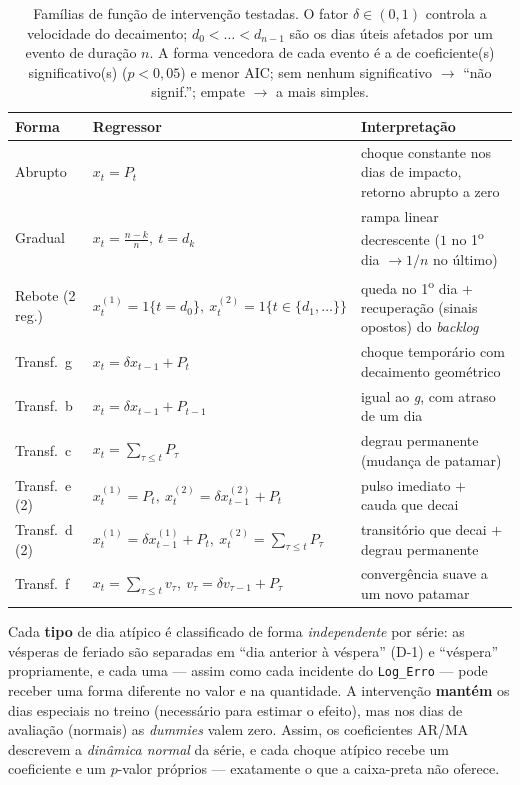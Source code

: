 \documentclass[11pt,a4paper]{article}
\begin{document}
\begin{table}[H]
\centering
\caption{Famílias de função de intervenção testadas. O fator $\delta \in (0,1)$ controla a
velocidade do decaimento; $d_0<\dots<d_{n-1}$ são os dias úteis afetados por um evento de duração
$n$. A forma vencedora de cada evento é a de coeficiente(s) significativo(s) ($p<0{,}05$) e menor
AIC; sem nenhum significativo $\to$ ``não signif.''; empate $\to$ a mais simples.}
\label{tab:transfer}
\small
\renewcommand{\arraystretch}{1.45}
\begin{tabular}{@{}llp{5.2cm}@{}}
\toprule
\textbf{Forma} & \textbf{Regressor} & \textbf{Interpretação} \\
\midrule
Abrupto        & $x_t = P_t$ & choque constante nos dias de impacto, retorno abrupto a zero \\
Gradual        & $x_t = \tfrac{n-k}{n},\ t=d_k$ & rampa linear decrescente ($1$ no 1\textsuperscript{o} dia $\to 1/n$ no último) \\
Rebote (2 reg.)& $x^{(1)}_t=1\{t=d_0\},\ x^{(2)}_t=1\{t\in\{d_1,\dots\}\}$ & queda no 1\textsuperscript{o} dia + recuperação (sinais opostos) do \emph{backlog} \\
Transf.\ g     & $x_t=\delta x_{t-1}+P_t$ & choque temporário com decaimento geométrico \\
Transf.\ b     & $x_t=\delta x_{t-1}+P_{t-1}$ & igual ao \emph{g}, com atraso de um dia \\
Transf.\ c     & $x_t=\sum_{\tau\le t}P_\tau$ & degrau permanente (mudança de patamar) \\
Transf.\ e (2) & $x^{(1)}_t=P_t,\ x^{(2)}_t=\delta x^{(2)}_{t-1}+P_t$ & pulso imediato $+$ cauda que decai \\
Transf.\ d (2) & $x^{(1)}_t=\delta x^{(1)}_{t-1}+P_t,\ x^{(2)}_t=\sum_{\tau\le t}P_\tau$ & transitório que decai $+$ degrau permanente \\
Transf.\ f     & $x_t=\sum_{\tau\le t}v_\tau,\ v_\tau=\delta v_{\tau-1}+P_\tau$ & convergência suave a um novo patamar \\
\bottomrule
\end{tabular}
\end{table}

\noindent
Cada \textbf{tipo} de dia atípico é classificado de forma \emph{independente} por série: as
vésperas de feriado são separadas em ``dia anterior à véspera'' (D-1) e ``véspera'' propriamente, e
cada uma --- assim como cada incidente do \texttt{Log\_Erro} --- pode receber uma forma diferente
no valor e na quantidade. A intervenção \textbf{mantém} os dias especiais no treino (necessário
para estimar o efeito), mas nos dias de avaliação (normais) as \emph{dummies} valem zero. Assim,
os coeficientes AR/MA descrevem a \emph{dinâmica normal} da série, e cada choque atípico recebe um
coeficiente e um $p$-valor próprios --- exatamente o que a caixa-preta não oferece.
\end{document}
